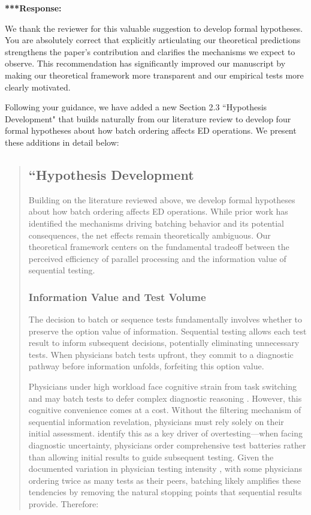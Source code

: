 \documentclass[11pt]{article}
\newcommand{\1}{\hbox{\rm 1\kern-.35em 1}}
\begin{document}
{{\noindent\textbf{***Response:} \color{blue}

We thank the reviewer for this valuable suggestion to develop formal hypotheses. You are absolutely correct that explicitly articulating our theoretical predictions strengthens the paper's contribution and clarifies the mechanisms we expect to observe. This recommendation has significantly improved our manuscript by making our theoretical framework more transparent and our empirical tests more clearly motivated.

Following your guidance, we have added a new Section 2.3 ``Hypothesis Development" that builds naturally from our literature review to develop four formal hypotheses about how batch ordering affects ED operations. We present these additions in detail below:

\begin{quote}
\subsection*{``Hypothesis Development}

Building on the literature reviewed above, we develop formal hypotheses about how batch ordering affects ED operations. While prior work has identified the mechanisms driving batching behavior and its potential consequences, the net effects remain theoretically ambiguous. Our theoretical framework centers on the fundamental tradeoff between the perceived efficiency of parallel processing and the information value of sequential testing.

\subsubsection*{Information Value and Test Volume}

The decision to batch or sequence tests fundamentally involves whether to preserve the option value of information. Sequential testing allows each test result to inform subsequent decisions, potentially eliminating unnecessary tests. When physicians batch tests upfront, they commit to a diagnostic pathway before information unfolds, forfeiting this option value.

Physicians under high workload face cognitive strain from task switching and may batch tests to defer complex diagnostic reasoning \cite{kc2013does, skaugset2016can}. However, this cognitive convenience comes at a cost. Without the filtering mechanism of sequential information revelation, physicians must rely solely on their initial assessment. \cite{lam2020why} identify this as a key driver of overtesting---when facing diagnostic uncertainty, physicians order comprehensive test batteries rather than allowing initial results to guide subsequent testing. Given the documented variation in physician testing intensity \cite{hodgson2018are}, with some physicians ordering twice as many tests as their peers, batching likely amplifies these tendencies by removing the natural stopping points that sequential results provide. Therefore:


\end{quote}}}
\end{document}
